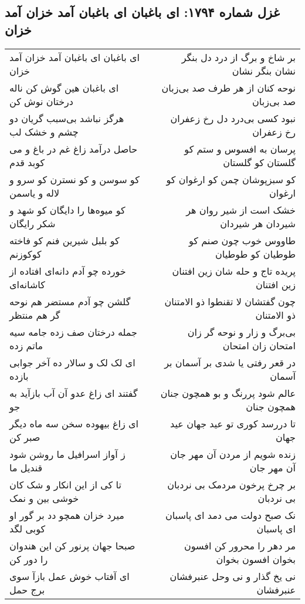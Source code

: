 \begin{center}
\section*{غزل شماره ۱۷۹۴: ای باغبان ای باغبان آمد خزان آمد خزان}
\label{sec:1794}
\begin{longtable}{l p{0.5cm} r}
ای باغبان ای باغبان آمد خزان آمد خزان
&&
بر شاخ و برگ از درد دل بنگر نشان بنگر نشان
\\
ای باغبان هین گوش کن ناله درختان نوش کن
&&
نوحه کنان از هر طرف صد بی‌زبان صد بی‌زبان
\\
هرگز نباشد بی‌سبب گریان دو چشم و خشک لب
&&
نبود کسی بی‌درد دل رخ زعفران رخ زعفران
\\
حاصل درآمد زاغ غم در باغ و می کوبد قدم
&&
پرسان به افسوس و ستم کو گلستان کو گلستان
\\
کو سوسن و کو نسترن کو سرو و لاله و یاسمن
&&
کو سبزپوشان چمن کو ارغوان کو ارغوان
\\
کو میوه‌ها را دایگان کو شهد و شکر رایگان
&&
خشک است از شیر روان هر شیردان هر شیردان
\\
کو بلبل شیرین فنم کو فاخته کوکوزنم
&&
طاووس خوب چون صنم کو طوطیان کو طوطیان
\\
خورده چو آدم دانه‌ای افتاده از کاشانه‌ای
&&
پریده تاج و حله شان زین افتنان زین افتنان
\\
گلشن چو آدم مستضر هم نوحه گر هم منتظر
&&
چون گفتشان لا تقنطوا ذو الامتنان ذو الامتنان
\\
جمله درختان صف زده جامه سیه ماتم زده
&&
بی‌برگ و زار و نوحه گر زان امتحان زان امتحان
\\
ای لک لک و سالار ده آخر جوابی بازده
&&
در قعر رفتی یا شدی بر آسمان بر آسمان
\\
گفتند ای زاغ عدو آن آب بازآید به جو
&&
عالم شود پررنگ و بو همچون جنان همچون جنان
\\
ای زاغ بیهوده سخن سه ماه دیگر صبر کن
&&
تا دررسد کوری تو عید جهان عید جهان
\\
ز آواز اسرافیل ما روشن شود قندیل ما
&&
زنده شویم از مردن آن مهر جان آن مهر جان
\\
تا کی از این انکار و شک کان خوشی بین و نمک
&&
بر چرخ پرخون مردمک بی نردبان بی نردبان
\\
میرد خزان همچو دد بر گور او کوبی لگد
&&
نک صبح دولت می دمد ای پاسبان ای پاسبان
\\
صبحا جهان پرنور کن این هندوان را دور کن
&&
مر دهر را محرور کن افسون بخوان افسون بخوان
\\
ای آفتاب خوش عمل بازآ سوی برج حمل
&&
نی یخ گذار و نی وحل عنبرفشان عنبرفشان

\end{longtable}
\end{center}
